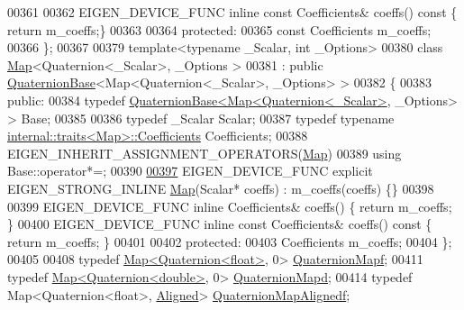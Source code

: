 \begin{DoxyCode}
00361 
00362     EIGEN\_DEVICE\_FUNC \textcolor{keyword}{inline} \textcolor{keyword}{const} Coefficients& coeffs()\textcolor{keyword}{ const }\{ \textcolor{keywordflow}{return} m\_coeffs;\}
00363 
00364   \textcolor{keyword}{protected}:
00365     \textcolor{keyword}{const} Coefficients m\_coeffs;
00366 \};
00367 
00379 \textcolor{keyword}{template}<\textcolor{keyword}{typename} \_Scalar, \textcolor{keywordtype}{int} \_Options>
00380 \textcolor{keyword}{class }\hyperlink{group___core___module_class_eigen_1_1_map}{Map}<Quaternion<\_Scalar>, \_Options >
00381   : \textcolor{keyword}{public} \hyperlink{group___geometry___module_class_eigen_1_1_quaternion_base}{QuaternionBase}<Map<Quaternion<\_Scalar>, \_Options> >
00382 \{
00383   \textcolor{keyword}{public}:
00384     \textcolor{keyword}{typedef} \hyperlink{group___geometry___module_class_eigen_1_1_quaternion_base}{QuaternionBase<Map<Quaternion<\_Scalar>}, \_Options> > Base;
00385 
00386     \textcolor{keyword}{typedef} \_Scalar Scalar;
00387     \textcolor{keyword}{typedef} \textcolor{keyword}{typename} \hyperlink{struct_eigen_1_1internal_1_1traits}{internal::traits<Map>::Coefficients} Coefficients;
00388     EIGEN\_INHERIT\_ASSIGNMENT\_OPERATORS(\hyperlink{group___core___module_class_eigen_1_1_map}{Map})
00389     \textcolor{keyword}{using} Base::operator*=;
00390 
\hyperlink{group___geometry___module_ad94fc6daefd48cccb87aef782e0949e5}{00397}     EIGEN\_DEVICE\_FUNC \textcolor{keyword}{explicit} EIGEN\_STRONG\_INLINE \hyperlink{group___geometry___module_ad94fc6daefd48cccb87aef782e0949e5}{Map}(Scalar* coeffs) : m\_coeffs(coeffs) \{\}
00398 
00399     EIGEN\_DEVICE\_FUNC \textcolor{keyword}{inline} Coefficients& coeffs() \{ \textcolor{keywordflow}{return} m\_coeffs; \}
00400     EIGEN\_DEVICE\_FUNC \textcolor{keyword}{inline} \textcolor{keyword}{const} Coefficients& coeffs()\textcolor{keyword}{ const }\{ \textcolor{keywordflow}{return} m\_coeffs; \}
00401 
00402   \textcolor{keyword}{protected}:
00403     Coefficients m\_coeffs;
00404 \};
00405 
00408 \textcolor{keyword}{typedef} \hyperlink{group___core___module_class_eigen_1_1_map}{Map<Quaternion<float>}, 0>         \hyperlink{group___geometry___module_ga7dad770768dc28ad3cee4696841a5dd4}{QuaternionMapf};
00411 \textcolor{keyword}{typedef} \hyperlink{group___core___module_class_eigen_1_1_map}{Map<Quaternion<double>}, 0>        \hyperlink{group___geometry___module_gac566b934815fa5293437b5d0c065d4e8}{QuaternionMapd};
00414 \textcolor{keyword}{typedef} Map<Quaternion<float>, \hyperlink{group__enums_gga45fe06e29902b7a2773de05ba27b47a1ad37d4c71425bb286e9b4103830538fbf}{Aligned}>   \hyperlink{group___geometry___module_ga1224c70c2ecdaeb4bffa4887dbf2d04d}{QuaternionMapAlignedf};

\end{DoxyCode}
